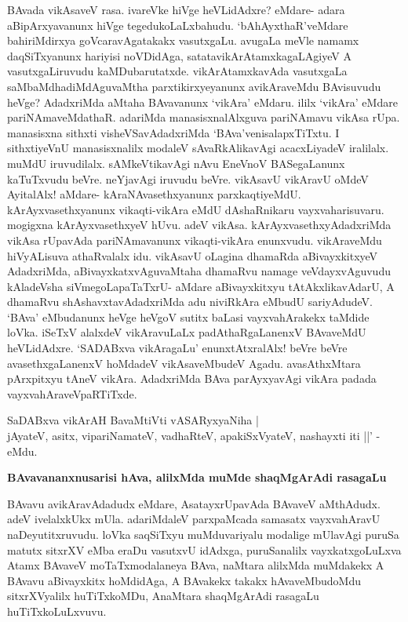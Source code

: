 \noindent
BAvada vikAsaveV rasa. ivareVke hiVge heVLidAdxre? eMdare- adara aBipArxyavanunx hiVge tegedu\-koLaLxbahudu. `bAhAyxthaR'veMdare bahiriMdirxya goVcaravAgatakakx vasutxgaLu. avugaLa meVle namamx daqSiTxyanunx hariyisi noVDidAga, satatavikArAtamxkagaLAgiyeV A vasutxgaLiruvudu kaMDubarutatxde. vikA\-rAtamxkavAda vasutxgaLa saMbaMdhadiMdAguvaMtha parxtikirxyeyanunx avikAraveMdu BAvisuvudu heVge? Adadx\-riMda aMtaha BAvavanunx `vikAra' eMdaru. ililx `vikAra' eMdare pariNAmaveMdathaR. adariMda manasisx\-nalAlxguva pariNAmavu vikAsa rUpa. manasisxna sithxti visheVSavAdadxriMda `BAva'venisalapxTiTxtu. I sithxti\-yeVnU manasisxnalilx modaleV sAvaRkAlikavAgi acacxLiyadeV iralilalx. muMdU iruvudilalx. sAMkeV\-tikavAgi nAvu EneVnoV BASegaLanunx kaTuTxvudu beVre. neYjavAgi iruvudu beVre. vikAsavU vikA\-ravU oMdeV AyitalAlx! aMdare- kAraNAvasethxyanunx parxkaqtiyeMdU. kArAyxvasethxyanunx vikaqti-vikAra eMdU dAshaRnikaru vayxvaharisuvaru. mogigxna kArAyxvasethxyeV hUvu. adeV vikAsa. kArAyxvasethx\-yAdadx\-riMda vikAsa rUpavAda pariNAmavanunx vikaqti-vikAra enunxvudu. vikAraveMdu hiVyALisuva athaRvalalx idu. vikAsavU oLagina dhamaRda aBivayxkitxyeV AdadxriMda, aBivayxkatxvAguvaMtaha dhamaRvu namage veVdayxvAguvudu kAladeVsha siVmegoLapaTaTxrU- aMdare aBivayxkitxyu tAtAkxlikavAdarU, A dhamaRvu shAshavxtavAdadxriMda adu niviRkAra eMbudU sariyAdudeV. `BAva' eMbudanunx heVge heV\-goV sutitx baLasi vayxvahArakekx taMdide loVka. iSeTxV alalxdeV vikAravuLaLx padAthaRgaLanenxV BAvaveMdU heVLi\-dAdxre. `SADABxva vikAragaLu'\label{226} enunxtAtxralAlx! beVre beVre avasethxgaLanenxV hoMdadeV vikAsaveMbudeV Agadu. avasAthxMtara pArxpitxyu tAneV vikAra. AdadxriMda BAva parAyxyavAgi vikAra padada vayxvahAra\-veVpaRTiTxde.

\begin{shloka}
SaDABxva vikArAH BavaMtiVti vASARyxyaNiha | \\
jAyateV, asitx, vipariNamateV, vadhaRteV, apakiSxVyateV, nashayxti iti ||' -eMdu.
\end{shloka}

{\medskip
\noindent
{\large\bf BAvavananxnusarisi hAva, alilxMda muMde shaqMgArAdi rasagaLu}}\label{page226}
\medskip

\noindent
BAvavu avikAravAdadudx eMdare, AsatayxrUpavAda BAvaveV aMthAdudx. adeV ivelalxkUkx mUla. adariMdaleV parxpaMcada samasatx vayxvahAravU naDeyutitxruvudu. loVka saqSiTxyu muMduvariyalu modalige mUlavAgi puruSa matutx sitxrXV eMba eraDu vasutxvU idAdxga, puruSanalilx vayxkatxgoLuLxva Atamx BAvaveV moTaTxmodalaneya BAva, naMtara alilxMda muMdakekx A BAvavu aBivayxkitx hoMdidAga, A BAvakekx takakx hAvaveMbudoMdu sitxrXVyalilx huTiTxkoMDu, AnaMtara shaqMgArAdi rasagaLu huTiTxkoLuLxvuvu.

